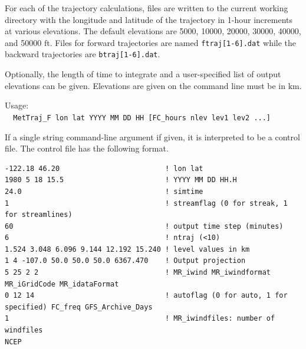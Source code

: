 \documentclass[11pt]{article}   %
\begin{document}
For each of the trajectory calculations, files are written to the current working directory
with the longitude and latitude of the trajectory in 1-hour increments at various
elevations.  The default elevations are 5000, 10000, 20000, 30000, 40000, and
50000 $\mathrm{ft}$.  Files for forward trajectories are named \texttt{ftraj[1-6].dat}
while the backward trajectories are  \texttt{btraj[1-6].dat}.

Optionally, the length of time to integrate and a user-specified list of output
elevations can be given.  Elevations are given on the command line must be in
$\mathrm{km}$.

Usage:\\
\verb|  MetTraj_F lon lat YYYY MM DD HH [FC_hours nlev lev1 lev2 ...]|

If a single string command-line argument if given, it is interpreted to be a control
file. The control file has the following format.

\footnotesize
\begin{verbatim}
-122.18 46.20                         ! lon lat
1980 5 18 15.5                        ! YYYY MM DD HH.H
24.0                                  ! simtime
1                                     ! streamflag (0 for streak, 1 for streamlines)
60                                    ! output time step (minutes)
6                                     ! ntraj (<10)
1.524 3.048 6.096 9.144 12.192 15.240 ! level values in km
1 4 -107.0 50.0 50.0 50.0 6367.470    ! Output projection
5 25 2 2                              ! MR_iwind MR_iwindformat MR_iGridCode MR_idataFormat
0 12 14                               ! autoflag (0 for auto, 1 for specified) FC_freq GFS_Archive_Days
1                                     ! MR_iwindfiles: number of windfiles
NCEP
\end{verbatim}
\normalsize
\end{document}
